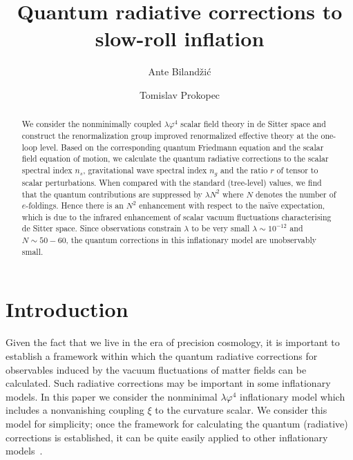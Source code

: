 \documentclass[aps,12pt,superscriptaddress,preprintnumbers,
                secnumarabic,nofootinbib,showpacs]{revtex4}
\begin{document}

\title{\Large Quantum radiative corrections to slow-roll
inflation}

\author{Ante Biland\v{z}i\'{c}}

\author{Tomislav Prokopec}

\begin{abstract}
We consider the nonminimally coupled $\lambda\varphi^4$
scalar field theory in de Sitter space
and construct the renormalization group improved renormalized effective theory
at the one-loop level.
Based on the corresponding quantum Friedmann equation
and the scalar field equation of motion,
we calculate the quantum radiative
corrections to the scalar spectral index $n_s$, gravitational wave
spectral index $n_g$ and the ratio $r$ of tensor to scalar
perturbations. When compared with the standard (tree-level) values,
we find that the quantum contributions are suppressed by $\lambda N^2$
where $N$ denotes the number of $e$-foldings.
Hence there is an $N^2$ enhancement 
with respect to the na\"ive expectation, which is
due to the infrared enhancement of scalar vacuum fluctuations
characterising de Sitter space.
 Since observations constrain $\lambda$ to be very
small $\lambda \sim 10^{-12}$ and $N\sim 50-60$,
the quantum corrections in this inflationary model are unobservably small.

\end{abstract}


\maketitle

\section{Introduction}

Given the fact that we live in the era of precision cosmology, it
is important to establish a framework within which the quantum
radiative corrections for observables
 induced by the vacuum fluctuations of matter fields can be calculated.
Such radiative corrections may be important in some inflationary models.
In this paper we consider the nonminimal
${\lambda\varphi^4}$ inflationary model which includes a nonvanishing
coupling $\xi$ to the curvature scalar.
 We consider this model for simplicity; once the framework for
calculating the quantum (radiative) corrections is established, it
can be quite easily applied to other inflationary
models~\cite{ProkopecBilandzic}.
\end{document}
